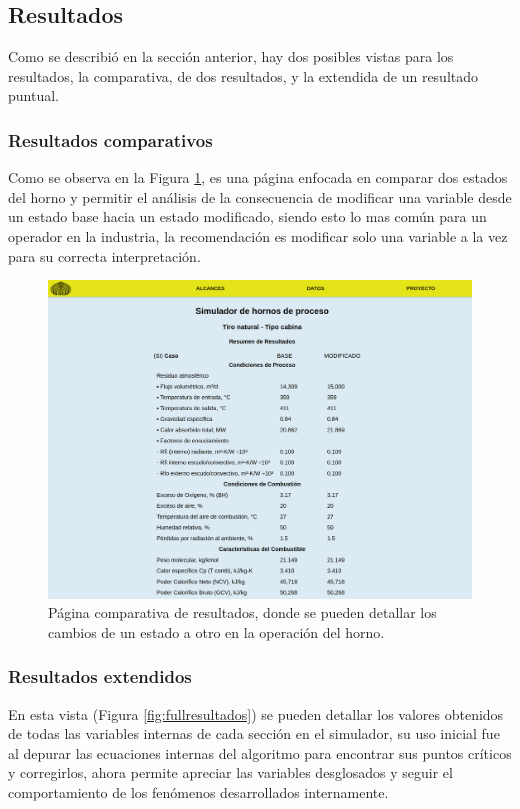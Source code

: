\subsection{Resultados}

\par Como se describió en la sección anterior, hay dos posibles vistas para los resultados, la comparativa, de dos resultados, y la extendida de un resultado puntual. 
\subsubsection{Resultados comparativos}

\par Como se observa en la Figura \ref{fig:resultados}, es una página enfocada en comparar dos estados del horno y permitir el análisis de la consecuencia de modificar una variable desde un estado base hacia un estado modificado, siendo esto lo mas común para un operador en la industria, la recomendación es modificar solo una variable a la vez para su correcta interpretación.
\begin{figure}[hbt]
\begin{center}
\includegraphics[scale=0.15]{images/resultadosdoble}
\caption[Página comparativa de resultados]{Página comparativa de resultados, donde se pueden detallar los cambios de un estado a otro en la operación del horno.}
\label{fig:resultados}
\end{center}
\end{figure}

\subsubsection{Resultados extendidos}
\par En esta vista (Figura \ref{fig:fullresultados}) se pueden detallar los valores obtenidos de todas las variables internas de cada sección en el simulador, su uso inicial fue al depurar las ecuaciones internas del algoritmo para encontrar sus puntos críticos y corregirlos, ahora permite apreciar las variables desglosados y seguir el comportamiento de los fenómenos desarrollados internamente.

